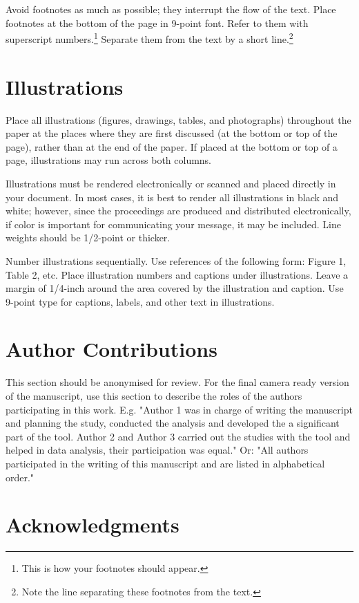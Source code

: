 \documentclass[letterpaper]{article}
\begin{document}
Avoid footnotes as much as possible; they interrupt the flow of
the text. 
Place footnotes at the bottom of the page in 9-point font.  Refer to
them with superscript numbers.\footnote{This is how your footnotes
should appear.} Separate them from the text by a short
line.\footnote{Note the line separating these footnotes from the
text.} 

\section{Illustrations}

Place all illustrations (figures, drawings, tables, and photographs)
throughout the paper at the places where they are first discussed (at the bottom
or top of the page), rather than at the end of the paper. If placed at the bottom or top of
a page, illustrations may run across both columns.

Illustrations must be rendered electronically or scanned and placed
directly in your document. In most cases, it is best to render all illustrations
in black and white; however, since the proceedings are produced and distributed electronically, if color
is important for communicating your message, it may be included. Line weights should
be 1/2-point or thicker.

Number illustrations sequentially. Use references of the following
form: Figure 1, Table 2, etc. Place illustration numbers and captions
under illustrations. Leave a margin of 1/4-inch around the area
covered by the illustration and caption.  Use 9-point type for
captions, labels, and other text in illustrations.

\section{Author Contributions}
This section should be anonymised for review. For the final camera ready version of the manuscript, use this section to describe the roles of the authors participating in this work. E.g. "Author 1 was in charge of writing the manuscript and planning the study, conducted the analysis and developed the a significant part of the tool. Author 2 and Author 3 carried out the studies with the tool and helped in data analysis, their participation was equal." Or: "All authors participated in the writing of this manuscript and are listed in alphabetical order."

\section{Acknowledgments}
\end{document}
